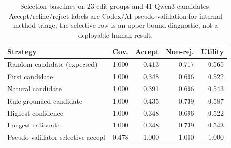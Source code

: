 \begin{table}[t]
\centering
\small
\begin{tabular}{lrrrr}
\toprule
Strategy & Cov. & Accept & Non-rej. & Utility \\
\midrule
Random candidate (expected) & 1.000 & 0.413 & 0.717 & 0.565 \\
First candidate & 1.000 & 0.348 & 0.696 & 0.522 \\
Natural candidate & 1.000 & 0.391 & 0.696 & 0.543 \\
Rule-grounded candidate & 1.000 & 0.435 & 0.739 & 0.587 \\
Highest confidence & 1.000 & 0.348 & 0.696 & 0.522 \\
Longest rationale & 1.000 & 0.348 & 0.739 & 0.543 \\
Pseudo-validator selective accept & 0.478 & 1.000 & 1.000 & 1.000 \\
\bottomrule
\end{tabular}
\caption{Selection baselines on 23 edit groups and 41 Qwen3 candidates. Accept/refine/reject labels are Codex/AI pseudo-validation for internal method triage; the selective row is an upper-bound diagnostic, not a deployable human result.}
\label{tab:rulefaith-selection-baselines}
\end{table}
